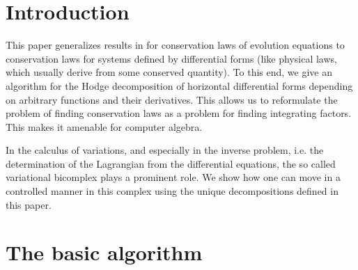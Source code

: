 \chapter{Introduction}\label{Sec0}
This paper generalizes results in \cite{SR94} for conservation laws of evolution
equations to conservation laws for systems defined by differential forms
(like physical laws, which usually derive from some conserved quantity).
To this end, we give an algorithm for the Hodge decomposition of horizontal 
differential forms
depending on arbitrary functions and their derivatives.
This allows us to reformulate the problem of finding conservation laws as a problem for finding integrating factors. This makes it amenable for computer algebra.

In the calculus of variations, and especially in the inverse problem,
i.e. the determination of the Lagrangian from the differential equations,
the so called variational bicomplex plays a prominent role. We show
how one can move in a controlled manner in this complex using the unique
decompositions defined in this paper.
\chapter{The basic algorithm}\label{Sec20}
